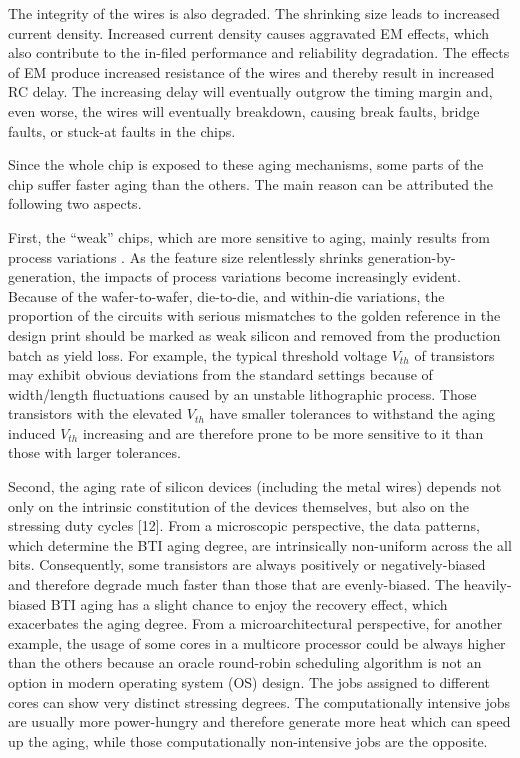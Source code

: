 The integrity of the wires is also degraded. The shrinking size leads to increased current density. Increased current density causes aggravated EM effects, which also contribute to the in-filed performance and reliability degradation. The effects of EM produce increased resistance of the wires and thereby result in increased RC delay. The increasing delay will eventually outgrow the timing margin and, even worse, the wires will eventually breakdown, causing break faults, bridge faults, or stuck-at faults in the chips. 

Since the whole chip is exposed to these aging mechanisms, some parts of the chip suffer faster aging than the others. The main reason can be attributed the following two aspects.

First, the “weak” chips, which are more sensitive to aging, mainly results from process variations \cite{borkar2003parameter}. As the feature size relentlessly shrinks generation-by-generation, the impacts of process variations become increasingly evident. Because of the wafer-to-wafer, die-to-die, and within-die variations, the proportion of the circuits with serious mismatches to the golden reference in the design print should be marked as weak silicon and removed from the production batch as yield loss. For example, the typical threshold voltage $V_{th}$ of transistors may exhibit obvious deviations from the standard settings because of width/length fluctuations caused by an unstable lithographic process. Those transistors with the elevated $V_{th}$ have smaller tolerances to withstand the aging induced $V_{th}$ increasing and are therefore prone to be more sensitive to it than those with larger tolerances.

Second, the aging rate of silicon devices (including the metal wires) depends not only on the intrinsic constitution of the devices themselves, but also on the stressing duty cycles [12]. From a microscopic perspective, the data patterns, which determine the BTI aging degree, are intrinsically non-uniform across the all bits. Consequently, some transistors are always positively or negatively-biased and therefore degrade much faster than those that are evenly-biased. The heavily-biased BTI aging has a slight chance to enjoy the recovery effect, which exacerbates the aging degree. From a microarchitectural perspective, for another example, the usage of some cores in a multicore processor could be always higher than the others because an oracle round-robin scheduling algorithm is not an option in modern operating system (OS) design. The jobs assigned to different cores can show very distinct stressing degrees. The computationally intensive jobs are usually more power-hungry and therefore generate more heat which can speed up the aging, while those computationally non-intensive jobs are the opposite.


